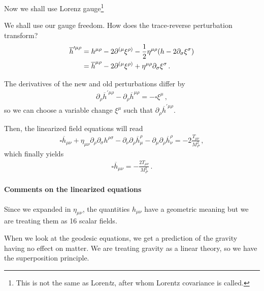 \documentclass[main.tex]{subfiles}
\begin{document}
Now we shall use Lorenz gauge\footnote{This is not the same as Loren\emph{t}z, after whom Lorentz covariance is called.}

We shall use our gauge freedom. How does the trace-reverse perturbation transform? 
%
\begin{subequations}
\begin{align}
\overline{h}^{\prime  \mu \rho } &=  
h^{\mu \rho } - 2 \partial^{(\mu} \xi^{\rho )} - \frac{1}{2 } \eta^{\mu \rho } \qty(h - 2 \partial_{\sigma } \xi^{\sigma })
\\
&=
\overline{h}^{\mu \rho } - 2 \partial^{(\mu } \xi^{\rho )} + \eta^{\mu \rho } \partial_{\sigma } \xi^{\sigma }
\,.
\end{align}
\end{subequations}
%

The derivatives of the new and old perturbations differ by 
%
\begin{align}
\partial_{\rho } \overline{h}^{\prime \mu \rho }
- \partial_{\rho } \overline{h}^{\mu \rho } = - \square \xi^{\mu }
\,,
\end{align}
%
so we can choose a variable change \(\xi^{\mu } \) such that \(\partial_{\rho} \overline{h}^{\prime \mu \rho }\).

Then, the linearized field equations will read 
%
\begin{align}
\square \overline{h}_{\mu \nu } 
+ \eta_{\mu \nu } \partial_{\rho }\partial_{\sigma } h^{\rho \sigma } 
-  \partial_{\nu } \partial_{\rho } \overline{h}^{\rho  }_{\mu } - \partial_{\mu } \partial_{\rho } \overline{h}^{\rho }_{\nu } = -2 \frac{T_{\mu \nu }}{M_P^2}
\,,
\end{align}
%
which finally yields 
%
\begin{align}
\square \overline{h}_{\mu \nu } = - \frac{2 T_{\mu \nu }}{M_P^2}
\,.
\end{align}

\paragraph{Comments on the linearized equations}

Since we expanded in \(\eta_{\mu \nu }\), the quantities \(h_{\mu \nu }\) have a geometric meaning but we are treating them as 16 scalar fields. 

When we look at the geodesic equations, we get a prediction of the gravity having no effect on matter. 
We are treating gravity as a linear theory, so we have the superposition principle. 
\end{document}
